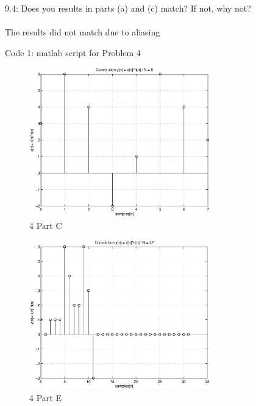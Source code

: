 
{\LARGE 9.4:}
Does you results in parts (a) and (c) match? If not, why not?\\ \\

The results did not match due to aliasing

\begin{center}
{Code 1: matlab script for Problem 4 }
\end{center}

\begin{figure}[!htbp]
  \centering
    \includegraphics[width=0.7\textwidth]{Figures/PS9-4-1.eps}
  \caption{4 Part C}
\end{figure}

\begin{figure}[!htbp]
  \centering
    \includegraphics[width=0.7\textwidth]{Figures/PS9-4-2.eps}
  \caption{4 Part E}
\end{figure}
